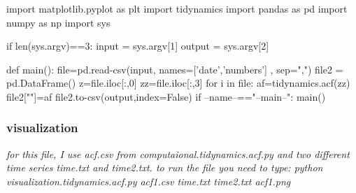 \documentclass[12pt, a4paper, twoside]{report}
\begin{document}
import matplotlib.pyplot as plt\newline
import tidynamics\newline
import pandas as pd\newline
import numpy as np\newline
import sys\newline

if len(sys.argv)==3:\newline
\hspace*{10mm} input = sys.argv[1]\newline
\hspace*{10mm} output = sys.argv[2]\newline


def main():\newline
\hspace*{10mm}    file=pd.read-csv(input, names=['date','numbers'] , sep=",") \newline
\hspace*{10mm}    file2 = pd.DataFrame()\newline
\hspace*{10mm}    z=file.iloc[:,0]\newline
\hspace*{10mm}    zz=file.iloc[:,3]\newline\newline
\hspace*{10mm}    for i in file:\newline
\hspace*{20mm}        af=tidynamics.acf(zz)\newline
\hspace*{10mm}    file2[""]=af\newline
\hspace*{10mm}   file2.to-csv(output,index=False) \newline
if --name--=="--main--":\newline
\hspace*{10mm}    main()\par






\subsubsection{visualization}
\textit{for this file, I use acf.csv from computaional.tidynamics.acf.py and two different time series time.txt and time2.txt.\newline
to run the file you need to type: python visualization.tidynamics.acf.py acf1.csv time.txt time2.txt acf1.png}
\end{document}
